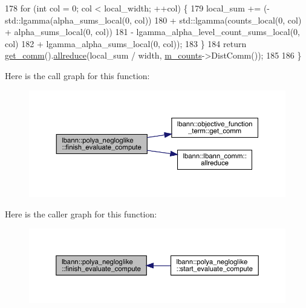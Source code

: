 \begin{DoxyCode}
178   \textcolor{keywordflow}{for} (\textcolor{keywordtype}{int} col = 0; col < local\_width; ++col) \{
179     local\_sum += (- std::lgamma(alpha\_sums\_local(0, col))
180                   + std::lgamma(counts\_local(0, col) + alpha\_sums\_local(0, col))
181                   - lgamma\_alpha\_level\_count\_sums\_local(0, col)
182                   + lgamma\_alpha\_sums\_local(0, col));
183   \}
184   \textcolor{keywordflow}{return} \hyperlink{classlbann_1_1objective__function__term_a5f89b676a26a6b76ddc26563ac87beb9}{get\_comm}().\hyperlink{classlbann_1_1lbann__comm_af5631e5f0f54e4df4958eba9df2599ef}{allreduce}(local\_sum / width, \hyperlink{classlbann_1_1polya__negloglike_a441387814cd7deafb1f70c91926d3004}{m\_counts}->DistComm());
185 
186 \}
\end{DoxyCode}
Here is the call graph for this function\+:\nopagebreak
\begin{figure}[H]
\begin{center}
\leavevmode
\includegraphics[width=350pt]{classlbann_1_1polya__negloglike_a81dbe71fef52ee0874549c4cf96c01e3_cgraph}
\end{center}
\end{figure}
Here is the caller graph for this function\+:\nopagebreak
\begin{figure}[H]
\begin{center}
\leavevmode
\includegraphics[width=350pt]{classlbann_1_1polya__negloglike_a81dbe71fef52ee0874549c4cf96c01e3_icgraph}
\end{center}
\end{figure}
\mbox{\label{classlbann_1_1polya__negloglike_ab787129d7caa79b04b91a9660b31d3b8}} 
